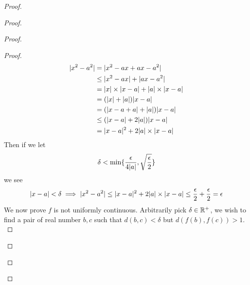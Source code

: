 \documentclass{report}
\begin{document}
\begin{proof}
\begin{proof}
\begin{proof}
\begin{proof}
\begin{align*}
  |x^2-a^2|&=|x^2-ax+ax-a^2|\\
  &\leq |x^2-ax|+|ax-a^2|\\
  &=|x|\times|x-a|+|a|\times |x-a|\\
  &=(|x|+|a|)|x-a|\\
  &=(|x-a+a|+|a|)|x-a|\\
  &\leq (|x-a|+2|a|)|x-a|\\
  &=|x-a|^2 +2 |a|\times |x-a|
\end{align*}
Then if we let
\begin{equation*}
  \delta< \min \{ \frac{\epsilon }{4|a|},\sqrt{\frac{\epsilon}{2}}  \}
\end{equation*}
we see 
\begin{equation*}
|x-a|<\delta \implies |x^2-a^2|\leq |x-a|^2 + 2|a|\times |x-a|\leq \frac{\epsilon}{2}+ \frac{\epsilon}{2}=\epsilon 
\end{equation*}
We now prove $f$ is not uniformly continuous. Arbitrarily pick $\delta\in\mathbb{R}^+$, we wish to find a pair of real number $b,c$ such that $d(b,c)<\delta$ but $d(f(b),f(c))>1$.\\


\end{proof}
\end{proof}
\end{proof}
\end{proof}
\end{document}
